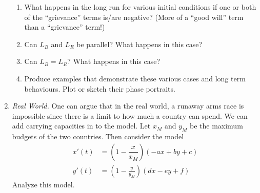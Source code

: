 \begin{enumerate}[label=\emph{\arabic*.}]
\begin{enumerate}[label=\emph{(\alph*)}]
\item What happens in the long run for various initial conditions if one or both of the ``grievance'' terms is/are negative? (More of a ``good will'' term than a ``grievance'' term!)



\item Can $L_B$ and $L_R$ be parallel? What happens in this case?

\item Can $L_B = L_R$? What happens in this case?

\item Produce examples that demonstrate these various cases and long term behaviours. Plot or sketch their phase portraits.
\end{enumerate}

\item \emph{Real World.}
	One can argue that in the real world, a runaway arms race is impossible since there is a limit to how much a country can spend. We can add carrying capacities in to the model. Let $x_M$ and $y_M$ be the maximum budgets of the two countries. Then consider the model
\begin{align*}
x'(t) &= \left(1- \dfrac{x}{x_M}\right) (-ax + by + c)\\
y'(t) &=\left(1-\frac{y}{y_M}\right)(dx-ey+f)
\end{align*}
Analyze this model.

\end{enumerate}


